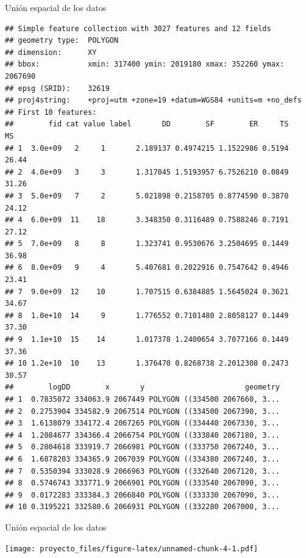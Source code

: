 \documentclass[11pt,]{article}
\begin{document}
Unión espacial de los datos

\begin{verbatim}
## Simple feature collection with 3027 features and 12 fields
## geometry type:  POLYGON
## dimension:      XY
## bbox:           xmin: 317400 ymin: 2019180 xmax: 352260 ymax: 2067690
## epsg (SRID):    32619
## proj4string:    +proj=utm +zone=19 +datum=WGS84 +units=m +no_defs
## First 10 features:
##        fid cat value label       DD        SF        ER     TS    MS
## 1  3.0e+09   2     1       2.189137 0.4974215 1.1522986 0.5194 26.44
## 2  4.0e+09   3     3       1.317045 1.5193957 6.7526210 0.0849 31.26
## 3  5.0e+09   7     2       5.021898 0.2158705 0.8774590 0.3870 24.12
## 4  6.0e+09  11    18       3.348350 0.3116489 0.7588246 0.7191 27.12
## 5  7.0e+09   8     8       1.323741 0.9530676 3.2504695 0.1449 36.98
## 6  8.0e+09   9     4       5.407681 0.2022916 0.7547642 0.4946 23.41
## 7  9.0e+09  12    10       1.707515 0.6384885 1.5645024 0.3621 34.67
## 8  1.0e+10  14     9       1.776552 0.7101480 2.8058127 0.1449 37.30
## 9  1.1e+10  15    14       1.017378 1.2400654 3.7077166 0.1449 37.36
## 10 1.2e+10  10    13       1.376470 0.8268738 2.2012308 0.2473 30.57
##        logDD        x       y                       geometry
## 1  0.7835072 334063.9 2067449 POLYGON ((334500 2067660, 3...
## 2  0.2753904 334582.9 2067514 POLYGON ((334500 2067390, 3...
## 3  1.6138079 334172.4 2067265 POLYGON ((334440 2067330, 3...
## 4  1.2084677 334366.4 2066754 POLYGON ((333840 2067180, 3...
## 5  0.2804618 333919.7 2066981 POLYGON ((333750 2067240, 3...
## 6  1.6878203 334365.9 2067039 POLYGON ((334380 2067240, 3...
## 7  0.5350394 333028.9 2066963 POLYGON ((332640 2067120, 3...
## 8  0.5746743 333771.9 2066901 POLYGON ((333540 2067090, 3...
## 9  0.0172283 333384.3 2066840 POLYGON ((333330 2067090, 3...
## 10 0.3195221 332580.6 2066931 POLYGON ((332280 2067000, 3...
\end{verbatim}

Unión espacial de los datos

\texttt{[image: proyecto\_files/figure-latex/unnamed-chunk-4-1.pdf]}
\end{document}
